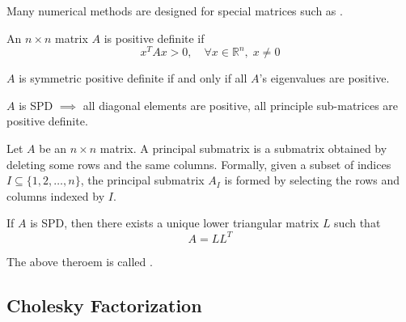 Many numerical methods are designed for special matrices such as .

\begin{definition}
    An $n \times n$ matrix $A$ is positive definite if
    \[
        x^T Ax > 0, \quad \forall x \in \mathbb{R}^n, \; x \neq 0
    \]
\end{definition}

\begin{theorem}
    $A$ is symmetric positive definite if and only if all $A$'s eigenvalues are positive.
\end{theorem}

\begin{theorem}
    $A$ is SPD $\implies$ all diagonal elements are positive, all principle sub-matrices are positive definite.
\end{theorem}

\begin{definition}
    Let $A$ be an $n \times n$ matrix. A principal submatrix is a submatrix obtained by deleting some rows and the same columns.
    Formally, given a subset of indices $I \subseteq \{1, 2, \dots, n\}$, the principal submatrix $A_I$ is formed by selecting the rows and columns indexed by $I$.
\end{definition}

\begin{theorem}
    If $A$ is SPD, then there exists a unique lower triangular matrix $L$ such that \[
        A = LL^T
    \]
\end{theorem}

The above theroem is called .

\subsection{Cholesky Factorization}

